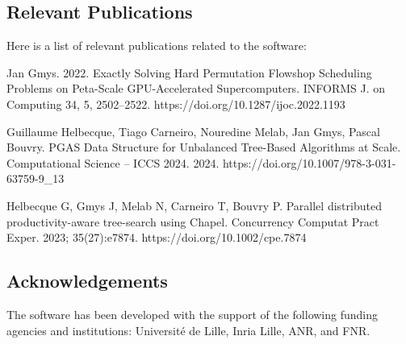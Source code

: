 \subsection{Relevant Publications}
\label{sec:pBB:publications}

Here is a list of relevant publications related to the software:

Jan Gmys. 2022. Exactly Solving Hard Permutation Flowshop Scheduling Problems on Peta-Scale GPU-Accelerated Supercomputers. INFORMS J. on Computing 34, 5, 2502–2522. https://doi.org/10.1287/ijoc.2022.1193

Guillaume Helbecque, Tiago Carneiro, Nouredine Melab, Jan Gmys, Pascal Bouvry. PGAS Data Structure for Unbalanced Tree-Based Algorithms at Scale. Computational Science – ICCS 2024. 2024. https://doi.org/10.1007/978-3-031-63759-9\_13

Helbecque G, Gmys J, Melab N, Carneiro T, Bouvry P. Parallel distributed productivity-aware tree-search using Chapel. Concurrency Computat Pract Exper. 2023; 35(27):e7874. https://doi.org/10.1002/cpe.7874

\subsection{Acknowledgements}
\label{sec::pBB:acknowledgements}

The software has been developed with the support of the following funding agencies and institutions: Université de Lille, Inria Lille, ANR, and FNR.